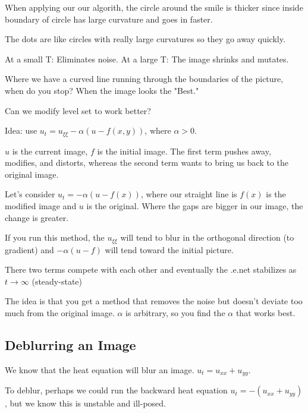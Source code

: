 When applying our our algorith, the circle around the smile is thicker since inside boundary of circle has large curvature and goes in faster.

The dots are like circles with really large curvatures so they go away quickly.

At a small T: Eliminates noise.
At a large T: The image shrinks and mutates.



Where we have a curved line running through the boundaries of the picture, when do you stop? When the image looks the "Best."

Can we modify level set to work better?

Idea: use $u_t = u_{\xi\xi} - \alpha(u - f(x, y))$, where $\alpha > 0$.

$u$ is the current image, $f$ is the initial image. The first term pushes away, modifies, and distorts, whereas the second term wants to bring us back to the original image.

Let's consider $u_t = - \alpha(u - f(x))$, where our straight line is $f(x)$ is the modified image and $u$ is the original. Where the gaps are bigger in our image, the change is greater.

If you run this method, the $u_{\xi\xi}$ will tend to blur in the orthogonal direction (to gradient) and $-\alpha(u - f)$ will tend toward the initial picture.

There two terms compete with each other and eventually the .e.net stabilizes as $t \to \infty$ (steady-state)

The idea is that you get a method that removes the noise but doesn't deviate too much from the original image. $\alpha$ is arbitrary, so you find the $\alpha$ that works best.

\subsection{Deblurring an Image}

We know that the heat equation will blur an image. $u_t = u_{xx} + u_{yy}$.

To deblur, perhaps we could run the backward heat equation $u_t = -(u_{xx} + u_{yy})$, but we know this is unstable and ill-posed.

